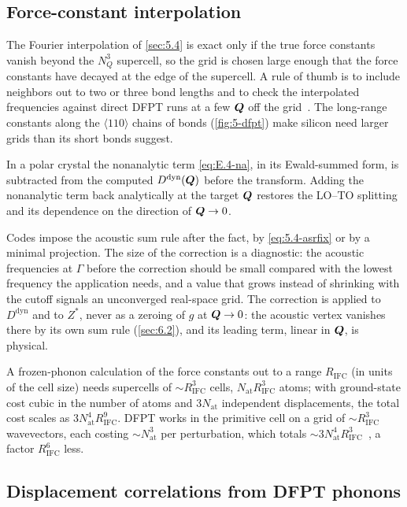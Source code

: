 \subsection{Force-constant interpolation}

The Fourier interpolation of \cref{sec:5.4} is exact only if the true force constants vanish beyond the $N_Q^3$ supercell, so the grid is chosen large enough that the force constants have decayed at the edge of the supercell. A rule of thumb is to include neighbors out to two or three bond lengths and to check the interpolated frequencies against direct DFPT runs at a few $\bm{Q}$ off the grid~\cite[Sect.~II.D.3]{baroni2001phonons}. The long-range constants along the $\langle 110\rangle$ chains of bonds (\cref{fig:5-dfpt}) make silicon need larger grids than its short bonds suggest.

In a polar crystal the nonanalytic term \cref{eq:E.4-na}, in its Ewald-summed form, is subtracted from the computed $D^{\mathrm{dyn}}(\bm{Q})$ before the transform. Adding the nonanalytic term back analytically at the target $\bm{Q}$ restores the LO--TO splitting and its dependence on the direction of $\bm{Q}\to 0$.

Codes impose the acoustic sum rule after the fact, by \cref{eq:5.4-asrfix} or by a minimal projection. The size of the correction is a diagnostic: the acoustic frequencies at $\Gamma$ before the correction should be small compared with the lowest frequency the application needs, and a value that grows instead of shrinking with the cutoff signals an unconverged real-space grid. The correction is applied to $D^{\mathrm{dyn}}$ and to $Z^*$, never as a zeroing of $g$ at $\bm{Q}\to 0$: the acoustic vertex vanishes there by its own sum rule (\cref{sec:6.2}), and its leading term, linear in $\bm{Q}$, is physical.

A frozen-phonon calculation of the force constants out to a range $R_{\mathrm{IFC}}$ (in units of the cell size) needs supercells of $\sim R_{\mathrm{IFC}}^3$ cells, $N_{\mathrm{at}}R_{\mathrm{IFC}}^3$ atoms; with ground-state cost cubic in the number of atoms and $3N_{\mathrm{at}}$ independent displacements, the total cost scales as $3N_{\mathrm{at}}^4R_{\mathrm{IFC}}^9$. DFPT works in the primitive cell on a grid of $\sim R_{\mathrm{IFC}}^3$ wavevectors, each costing $\sim N_{\mathrm{at}}^3$ per perturbation, which totals $\sim 3N_{\mathrm{at}}^4R_{\mathrm{IFC}}^3$~\cite[Sect.~IV.B]{baroni2001phonons}, a factor $R_{\mathrm{IFC}}^6$ less.

\subsection{Displacement correlations from DFPT phonons}

